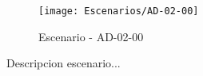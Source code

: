 \begin{figure}[H]
\centering
\texttt{[image: Escenarios/AD-02-00]}
\caption{Escenario - AD-02-00}
\label{fig:AD-02-00}
\end{figure}

Descripcion escenario...
\clearpage
